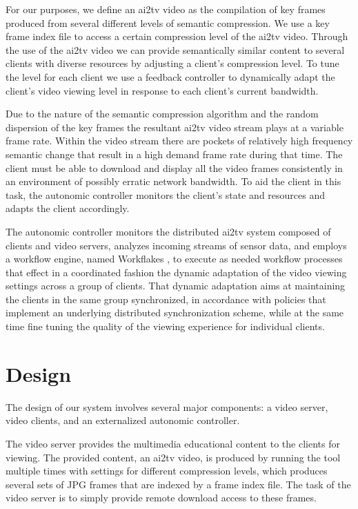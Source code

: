 \documentclass{sig-alternate}
\begin{document}
For our purposes, we define an ai2tv video as the
compilation of key frames produced from several different levels of
semantic compression.  We use a key frame index file to access a
certain compression level of the ai2tv video.  Through the
use of the ai2tv video we can provide semantically similar
content to several clients with diverse resources by adjusting a
client's compression level.  To tune the level for each client we use
a feedback controller to dynamically adapt the client's video viewing
level in response to each client's current bandwidth.

Due to the nature of the semantic compression algorithm and the random
dispersion of the key frames the resultant ai2tv video stream plays at
a variable frame rate.  Within the video stream there are pockets of
relatively high frequency semantic change that result in a high demand
frame rate during that time.  The client must be able to download and
display all the video frames consistently in an environment of
possibly erratic network bandwidth.  To aid the client in this task,
the autonomic controller monitors the client's state and resources and
adapts the client accordingly.

The autonomic controller monitors the distributed ai2tv system
composed of clients and video servers, analyzes incoming streams of
sensor data, and employs a workflow engine, named Workflakes
\cite{PEPPO}, to execute as needed workflow processes that effect in a
coordinated fashion the dynamic adaptation of the video viewing
settings across a group of clients.  That dynamic adaptation aims at
maintaining the clients in the same group synchronized, in accordance
with policies that implement an underlying distributed synchronization
scheme, while at the same time fine tuning the quality of the viewing
experience for individual clients.

\section{Design} \label{design}

The design of our system involves several major components: a video
server, video clients, and an externalized autonomic controller.

%

The video server provides the multimedia educational content to the
clients for viewing.  The provided content, an ai2tv video, is
produced by running the tool multiple times with settings for
different compression levels, which produces several sets of JPG
frames that are indexed by a frame index file.  The task of the video
server is to simply provide remote download access to these frames.
\end{document}

